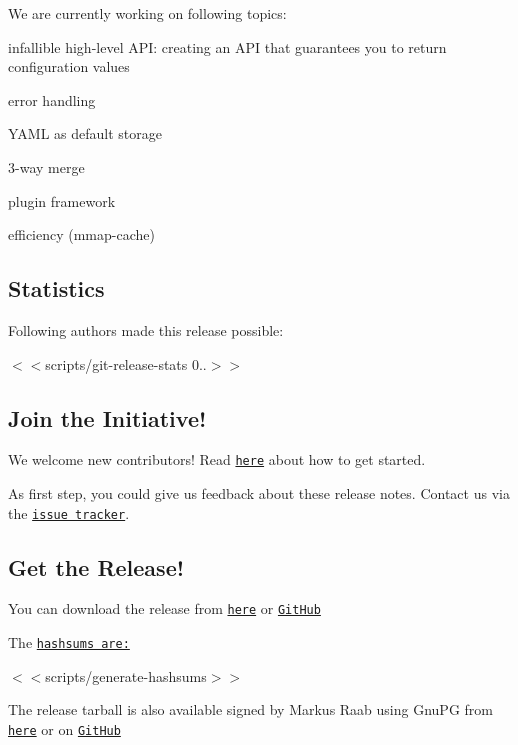 We are currently working on following topics\+:


\begin{DoxyItemize}
\item infallible high-\/level A\+PI\+: creating an A\+PI that guarantees you to return configuration values
\item error handling
\item Y\+A\+ML as default storage
\item 3-\/way merge
\item plugin framework
\item efficiency (mmap-\/cache)
\end{DoxyItemize}

\subsection*{Statistics}

Following authors made this release possible\+:

$<$$<${\ttfamily scripts/git-\/release-\/stats 0..}$>$$>$

\subsection*{Join the Initiative!}

We welcome new contributors! Read \href{https://www.libelektra.org/devgettingstarted/ideas}{\tt here} about how to get started.

As first step, you could give us feedback about these release notes. Contact us via the \href{https://issues.libelektra.org}{\tt issue tracker}.

\subsection*{Get the Release!}

You can download the release from \href{https://www.libelektra.org/ftp/elektra/releases/elektra-0.8.26.tar.gz}{\tt here} or \href{https://github.com/ElektraInitiative/ftp/blob/master/releases/elektra-0.8.26.tar.gz?raw=true}{\tt Git\+Hub}

The \href{https://github.com/ElektraInitiative/ftp/blob/master/releases/elektra-0.8.26.tar.gz.hashsum?raw=true}{\tt hashsums are\+:}

$<$$<${\ttfamily scripts/generate-\/hashsums}$>$$>$

The release tarball is also available signed by Markus Raab using Gnu\+PG from \href{https://www.libelektra.org/ftp/elektra/releases/elektra-0.8.26.tar.gz.gpg}{\tt here} or on \href{https://github.com/ElektraInitiative/ftp/blob/master/releases//elektra-0.8.26.tar.gz.gpg?raw=true}{\tt Git\+Hub}

